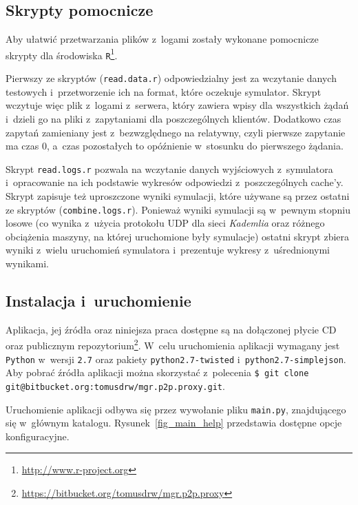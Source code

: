 \documentclass[a4paper,11pt]{scrartcl}
\newcommand{\f}{\texttt}
\newcommand{\keszy}{cache'y}
\begin{document}
\subsection{Skrypty pomocnicze}
Aby ułatwić przetwarzania plików z~logami zostały wykonane pomocnicze skrypty dla środowiska \f{R}\footnote{\url{http://www.r-project.org}}. 

Pierwszy ze skryptów (\f{read.data.r}) odpowiedzialny jest za wczytanie danych testowych i~przetworzenie ich na format, które oczekuje symulator. Skrypt wczytuje więc plik z~logami z~serwera, który zawiera wpisy dla wszystkich żądań i~dzieli go na pliki z~zapytaniami dla poszczególnych klientów. Dodatkowo czas zapytań zamieniany jest z~bezwzględnego na relatywny, czyli pierwsze zapytanie ma czas $0$, a~czas pozostałych to opóźnienie w~stosunku do pierwszego żądania.

Skrypt \f{read.logs.r} pozwala na wczytanie danych wyjściowych z~symulatora i~opracowanie na ich podstawie wykresów odpowiedzi z~poszczególnych \keszy. Skrypt zapisuje też uproszczone wyniki symulacji, które używane są przez ostatni ze skryptów (\f{combine.logs.r}). Ponieważ wyniki symulacji są w~pewnym stopniu losowe (co wynika z~użycia protokołu UDP dla sieci \textit{Kademlia} oraz różnego obciążenia maszyny, na której uruchomione były symulacje) ostatni skrypt zbiera wyniki z~wielu uruchomień symulatora i~prezentuje wykresy z~uśrednionymi wynikami.

\subsection{Instalacja i~uruchomienie}
\label{sect_impl_install}
Aplikacja, jej źródła oraz niniejsza praca dostępne są na dołączonej płycie CD oraz publicznym repozytorium\footnote{\url{https://bitbucket.org/tomusdrw/mgr.p2p.proxy}}. W~celu uruchomienia aplikacji wymagany jest \f{Python} w~wersji \f{2.7} oraz pakiety \f{python2.7-twisted} i~\f{python2.7-simplejson}. Aby pobrać źródła aplikacji można skorzystać z~polecenia \f{\$ git clone git@bitbucket.org:tomusdrw/mgr.p2p.proxy.git}.

Uruchomienie aplikacji odbywa się przez wywołanie pliku \f{main.py}, znajdującego się w~głównym katalogu. Rysunek~\ref{fig_main_help} przedstawia dostępne opcje konfiguracyjne.
\end{document}
